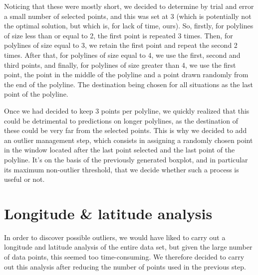 \documentclass[12pt, titlepage]{article}
\begin{document}
\begin{itemize}
    Noticing that these were mostly short, we decided to determine by trial and error a small number of selected points, and this was set at 3 (which is potentially not the optimal solution, but which is, for lack of time, ours).   So, firstly, for polylines of size less than or equal to 2, the first point is repeated 3 times. Then, for polylines of size equal to 3, we retain the first point and repeat the second 2 times. After that, for polylines of size equal to 4, we use the first, second and third points, and finally, for polylines of size greater than 4, we use the first point, the point in the middle of the polyline and a point drawn randomly from the end of the polyline. The destination being chosen for all situations as the last point of the polyline.

    Once we had decided to keep 3 points per polyline, we quickly realized that this could be detrimental to predictions on longer polylines, as the destination of these could be very far from the selected points. This is why we decided to add an outlier management step, which consists in assigning a randomly chosen point in the window located after the last point selected and the last point of the polyline. It's on the basis of the previously generated boxplot, and in particular its maximum non-outlier threshold, that we decide whether such a process is useful or not.
\end{itemize}

\section{Longitude \& latitude analysis}

In order to discover possible outliers, we would have liked to carry out a longitude and latitude analysis of the entire data set, but given the large number of data points, this seemed too time-consuming. We therefore decided to carry out this analysis after reducing the number of points used in the previous step.
\end{document}
